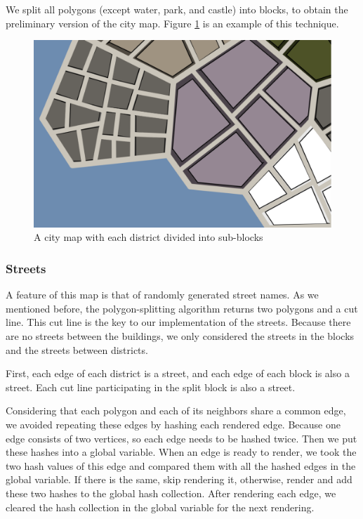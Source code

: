 We split all polygons (except water, park, and castle) into blocks, to obtain the preliminary version of the city map. Figure \ref{fig:blocks} is an example of this technique.

\begin{figure}[htbp]
  \includegraphics[width=\textwidth]{section04/assets/Map-blocks-no-buildings.png}
  \caption{A city map with each district divided into sub-blocks}
  \label{fig:blocks}
\end{figure}

\subsubsection{Streets}
A feature of this map is that of randomly generated street names. As we mentioned before, the polygon-splitting algorithm returns two polygons and a cut line. This cut line is the key to our implementation of the streets. Because there are no streets between the buildings, we only considered the streets in the blocks and the streets between districts.

First, each edge of each district is a street, and each edge of each block is also a street. Each cut line participating in the split block is also a street.

Considering that each polygon and each of its neighbors share a common edge, we avoided repeating these edges by hashing each rendered edge. Because one edge consists of two vertices, so each edge needs to be hashed twice. Then we put these hashes into a global variable. When an edge is ready to render, we took the two hash values of this edge and compared them with all the hashed edges in the global variable. If there is the same, skip rendering it, otherwise, render and add these two hashes to the global hash collection. After rendering each edge, we cleared the hash collection in the global variable for the next rendering.

